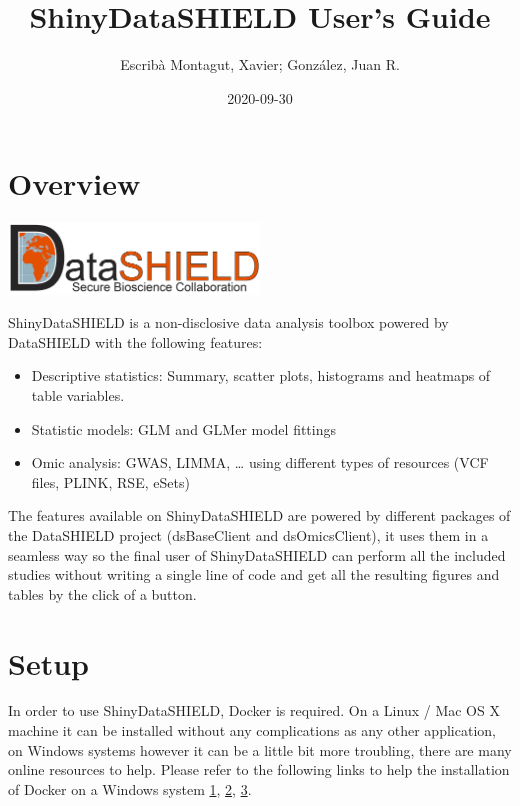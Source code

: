 \documentclass[
]{book}
\title{ShinyDataSHIELD User's Guide}
\author{Escribà Montagut, Xavier; González, Juan R.}
\date{2020-09-30}
\providecommand{\tightlist}{%
  \setlength{\itemsep}{0pt}\setlength{\parskip}{0pt}}
\begin{document}
\maketitle

{
\setcounter{tocdepth}{1}
\tableofcontents
}
\hypertarget{overview}{%
\chapter{Overview}\label{overview}}

\includegraphics[width=0.5\textwidth,height=\textheight]{images/ds_logo.png}

ShinyDataSHIELD is a non-disclosive data analysis toolbox powered by DataSHIELD with the following features:

\begin{itemize}
\tightlist
\item
  Descriptive statistics: Summary, scatter plots, histograms and heatmaps of table variables.
\item
  Statistic models: GLM and GLMer model fittings
\item
  Omic analysis: GWAS, LIMMA, \ldots{} using different types of resources (VCF files, PLINK, RSE, eSets)
\end{itemize}

The features available on ShinyDataSHIELD are powered by different packages of the DataSHIELD project (dsBaseClient and dsOmicsClient), it uses them in a seamless way so the final user of ShinyDataSHIELD can perform all the included studies without writing a single line of code and get all the resulting figures and tables by the click of a button.

\hypertarget{setup}{%
\chapter{Setup}\label{setup}}

In order to use ShinyDataSHIELD, Docker is required. On a Linux / Mac OS X machine it can be installed without any complications as any other application, on Windows systems however it can be a little bit more troubling, there are many online resources to help. Please refer to the following links to help the installation of Docker on a Windows system \href{https://docs.docker.com/docker-for-windows/install-windows-home/}{1}, \href{https://blog.nillsf.com/index.php/2020/02/17/setting-up-wsl2-windows-terminal-and-oh-my-zsh/}{2}, \href{https://docs.docker.com/docker-for-windows/wsl/}{3}.
\end{document}
